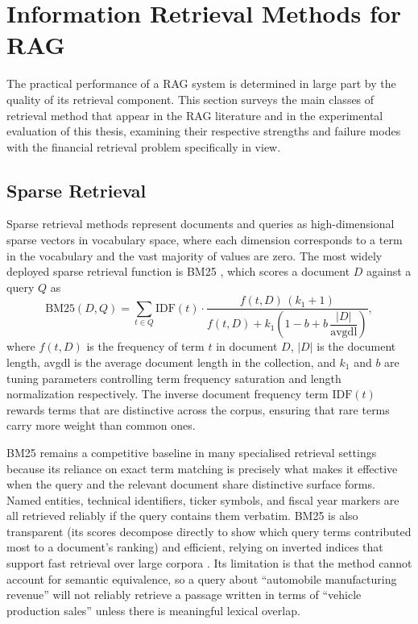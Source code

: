\documentclass[12pt,twoside,maitrise]{dms}
\theoremstyle{definition}
\numberwithin{equation}{section}
\numberwithin{table}{chapter}
\numberwithin{figure}{chapter}
\begin{document}
\section{Information Retrieval Methods for RAG}

The practical performance of a RAG system is determined in large part by the quality of
its retrieval component. This section surveys the main classes of retrieval method that
appear in the RAG literature and in the experimental evaluation of this thesis, examining
their respective strengths and failure modes with the financial retrieval problem
specifically in view.

\subsection{Sparse Retrieval}

Sparse retrieval methods represent documents and queries as high-dimensional sparse
vectors in vocabulary space, where each dimension corresponds to a term in the vocabulary
and the vast majority of values are zero. The most widely deployed sparse retrieval
function is BM25 \citep{robertson2009probabilistic}, which scores a document $D$ against
a query $Q$ as
\begin{equation}
  \text{BM25}(D, Q) = \sum_{t \in Q} \text{IDF}(t) \cdot
  \frac{f(t,D)\,(k_1+1)}{f(t,D) + k_1\!\left(1 - b + b\,\dfrac{|D|}{\text{avgdl}}\right)},
\end{equation}
where $f(t, D)$ is the frequency of term $t$ in document $D$, $|D|$ is the document
length, avgdl is the average document length in the collection, and $k_1$ and $b$ are
tuning parameters controlling term frequency saturation and length normalization
respectively. The inverse document frequency term $\text{IDF}(t)$ rewards terms that
are distinctive across the corpus, ensuring that rare terms carry more weight than
common ones.

BM25 remains a competitive baseline in many specialised retrieval settings because its
reliance on exact term matching is precisely what makes it effective when the query and
the relevant document share distinctive surface forms. Named entities, technical
identifiers, ticker symbols, and fiscal year markers are all retrieved reliably if the
query contains them verbatim. BM25 is also transparent (its scores decompose directly
to show which query terms contributed most to a document's ranking) and efficient,
relying on inverted indices that support fast retrieval over large corpora
\citep{lin2021pyserini}. Its limitation is that the
method cannot account for semantic equivalence, so a query about ``automobile
manufacturing revenue'' will not reliably retrieve a passage written in terms of
``vehicle production sales'' unless there is meaningful lexical overlap.
\end{document}
